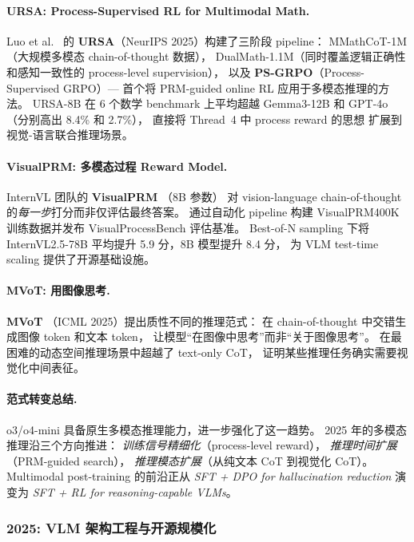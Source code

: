 \paragraph{URSA: Process-Supervised RL for Multimodal Math.}
Luo et al.\ \cite{luo2025ursa} 的 \textbf{URSA}（NeurIPS 2025）构建了三阶段 pipeline：
MMathCoT-1M（大规模多模态 chain-of-thought 数据），
DualMath-1.1M（同时覆盖逻辑正确性和感知一致性的 process-level supervision），
以及 \textbf{PS-GRPO}（Process-Supervised GRPO）---
首个将 PRM-guided online RL 应用于多模态推理的方法。
URSA-8B 在 6 个数学 benchmark 上平均超越 Gemma3-12B 和 GPT-4o
（分别高出 8.4\% 和 2.7\%），
直接将 Thread~4 中 process reward 的思想
扩展到视觉-语言联合推理场景。

\paragraph{VisualPRM: 多模态过程 Reward Model.}
InternVL 团队的 \textbf{VisualPRM} \cite{wang2025visualprm}（8B 参数）
对 vision-language chain-of-thought 的\textit{每一步}打分而非仅评估最终答案。
通过自动化 pipeline 构建 VisualPRM400K 训练数据并发布 VisualProcessBench 评估基准。
Best-of-N sampling 下将 InternVL2.5-78B 平均提升 5.9 分，8B 模型提升 8.4 分，
为 VLM test-time scaling 提供了开源基础设施。

\paragraph{MVoT: 用图像思考.}
\textbf{MVoT} \cite{li2025mvot}（ICML 2025）提出质性不同的推理范式：
在 chain-of-thought 中交错生成图像 token 和文本 token，
让模型``在图像中思考''而非``关于图像思考''。
在最困难的动态空间推理场景中超越了 text-only CoT，
证明某些推理任务确实需要视觉化中间表征。

\paragraph{范式转变总结.}
o3/o4-mini \cite{openai2025o3} 具备原生多模态推理能力，进一步强化了这一趋势。
2025 年的多模态推理沿三个方向推进：
\textit{训练信号精细化}（process-level reward），
\textit{推理时间扩展}（PRM-guided search），
\textit{推理模态扩展}（从纯文本 CoT 到视觉化 CoT）。
Multimodal post-training 的前沿正从
\textit{SFT + DPO for hallucination reduction}
演变为 \textit{SFT + RL for reasoning-capable VLMs}。

\subsubsection{2025: VLM 架构工程与开源规模化}
\label{sec:t5-scaling}

